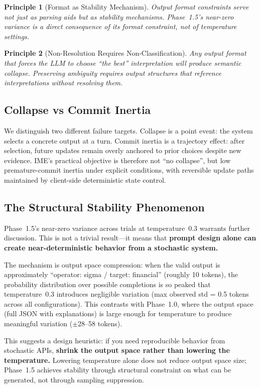 \documentclass[11pt,a4paper]{article}
\newtheorem{principle}{Principle}
\begin{document}
\begin{principle}[Format as Stability Mechanism]
Output format constraints serve not just as parsing aids but as stability
mechanisms. Phase~1.5's near-zero variance is a direct consequence of its format
constraint, not of temperature settings.
\end{principle}

\begin{principle}[Non-Resolution Requires Non-Classification]
Any output format that forces the LLM to choose ``the best'' interpretation
will produce semantic collapse. Preserving ambiguity requires output structures
that reference interpretations without resolving them.
\end{principle}

\subsection{Collapse vs Commit Inertia}

We distinguish two different failure targets. Collapse is a point event:
the system selects a concrete output at a turn. Commit inertia is a trajectory
effect: after selection, future updates remain overly anchored to prior choices
despite new evidence. IME's practical objective is therefore not ``no collapse'',
but low premature-commit inertia under explicit conditions, with reversible
update paths maintained by client-side deterministic state control.

\subsection{The Structural Stability Phenomenon}

Phase~1.5's near-zero variance across trials at temperature~0.3 warrants further
discussion. This is not a trivial result---it means that \textbf{prompt design
alone can create near-deterministic behavior from a stochastic system.}

The mechanism is output space compression: when the valid output is approximately
``operator: sigma / target: financial'' (roughly 10 tokens), the probability
distribution over possible completions is so peaked that temperature~0.3
introduces negligible variation (max observed std = 0.5 tokens across all
configurations). This contrasts with Phase~1.0, where the
output space (full JSON with explanations) is large enough for temperature to
produce meaningful variation ($\pm$28--58 tokens).

This suggests a design heuristic: if you need reproducible behavior from
stochastic APIs, \textbf{shrink the output space rather than lowering the
temperature.} Lowering temperature alone does not reduce output space size;
Phase~1.5 achieves stability through structural constraint on what can be
generated, not through sampling suppression.
\end{document}
